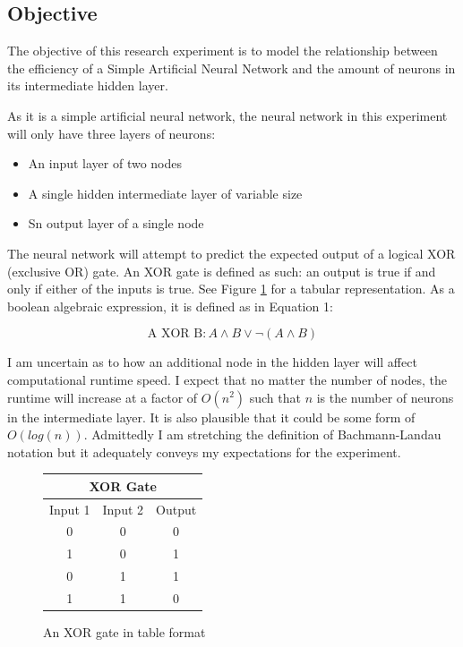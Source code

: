 \documentclass[12pt]{article}
\begin{document}
    \subsection{Objective \label{objectives}} 

        The objective of this research experiment is to model the relationship between the efficiency of a Simple Artificial Neural Network and the amount of neurons in its intermediate hidden layer.

        As it is a simple artificial neural network, the neural network in this experiment will only have three layers of neurons:

        \begin{itemize}
            \item An input layer of two nodes
            \item A single hidden intermediate layer of variable size
            \item Sn output layer of a single node
        \end{itemize}

        The neural network will attempt to predict the expected output of a logical XOR (exclusive OR) gate. An XOR gate is defined as such: an output is true if and only if either of the inputs is true. See Figure \ref{xortable} for a tabular representation. As a boolean algebraic expression, it is defined as in Equation 1:

        \begin{equation}
             \textrm{A XOR B}: A \wedge B \vee \neg(A \wedge B)
        \end{equation}

        I am uncertain as to how an additional node in the hidden layer will affect computational runtime speed. I expect that no matter the number of nodes, the runtime will increase at a factor of $O(n^2)$ such that $n$ is the number of neurons in the intermediate layer. It is also plausible that it could be some form of $O(log(n))$. Admittedly I am stretching the definition of Bachmann-Landau notation but it adequately conveys my expectations for the experiment.

        \begin{figure}[h]
            \begin{center}
                \begin{tabular}{|c|c|c|}
                    \hline
                    \multicolumn{3}{|c|}{XOR Gate} \\
                    \hline
                    Input 1 & Input 2 & Output \\
                    \hline
                    0 & 0 & 0 \\
                    1 & 0 & 1 \\
                    0 & 1 & 1 \\
                    1 & 1 & 0 \\
                    \hline
                \end{tabular}
            \end{center}
            \caption{An XOR gate in table format \label{xortable}}
        \end{figure}
    
\end{document}
